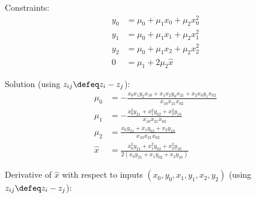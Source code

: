 \label{sec:monomial-yyy}

Constraints:
\begin{align}
y_0 & = \mu_0+\mu_1 x_0+\mu_2 x_0^{2}  
\\
y_1 & = \mu_0+\mu_1 x_1+\mu_2 x_1^{2}  
\nonumber 
\\
y_2 & = \mu_0+\mu_1 x_2+\mu_2 x_2^{2}  
\nonumber 
\\
0 & = \mu_1 + 2 \mu_2 \hat{x}  
\nonumber 
\end{align}

Solution (using $z_{ij} \defeq z_i - z_j$):
\begin{align}
\mu_0 & =
- \frac{
x_0 x_1 y_2 x_{10}
+
x_1 x_2 y_0 x_{21}
+
x_2 x_0 y_1 x_{02}
}{
x_{10} x_{21} x_{02}
} 
\\
\mu_1 & =
- \frac{
x_0^{2} y_{21}
+ 
x_1^{2} y_{02} 
+
x_2^{2} y_{10}
}{
x_{10} x_{21} x_{02}
} 
\nonumber \\
\mu_2 & = 
\frac{
x_0 y_{21} 
+
x_1 y_{02}
+
x_2 y_{10} 
}{
x_{10} x_{21} x_{02}
 } 
\nonumber  \\ 
 \hat{x} & = 
\frac{
x_0^{2} y_{21} 
 +
x_1^{2} y_{02} 
 +
x_2^{2} y_{10} 
}{
2 \left(
x_0 y_{21} 
+ 
x_1 y_{02} 
+ 
x_2 y_{10}  
\right)
}
\nonumber 
\end{align}

Derivative of $\hat{x}$ with respect to inputs
$(x_0,y_0,x_1,y_1,x_2,y_2)$
(using $z_{ij} \defeq z_i - z_j$):


